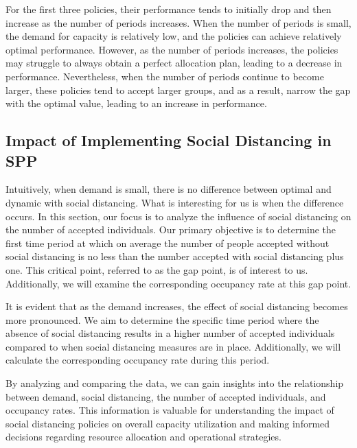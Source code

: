 For the first three policies, their performance tends to initially drop and then increase as the number of periods increases. When the number of periods is small, the demand for capacity is relatively low, and the policies can achieve relatively optimal performance. However, as the number of periods increases, the policies may struggle to always obtain a perfect allocation plan, leading to a decrease in performance. Nevertheless, when the number of periods continue to become larger, these policies tend to accept larger groups, and as a result, narrow the gap with the optimal value, leading to an increase in performance.


\subsection{Impact of Implementing Social Distancing in SPP}
Intuitively, when demand is small, there is no difference between optimal and dynamic with social distancing. What is interesting for us is when the difference occurs.
In this section, our focus is to analyze the influence of social distancing on the number of accepted individuals. Our primary objective is to determine the first time period at which on average the number of people accepted without social distancing is no less than the number accepted with social distancing plus one. This critical point, referred to as the gap point, is of interest to us. Additionally, we will examine the corresponding occupancy rate at this gap point.

It is evident that as the demand increases, the effect of social distancing becomes more pronounced. We aim to determine the specific time period where the absence of social distancing results in a higher number of accepted individuals compared to when social distancing measures are in place. Additionally, we will calculate the corresponding occupancy rate during this period.

By analyzing and comparing the data, we can gain insights into the relationship between demand, social distancing, the number of accepted individuals, and occupancy rates. This information is valuable for understanding the impact of social distancing policies on overall capacity utilization and making informed decisions regarding resource allocation and operational strategies.

